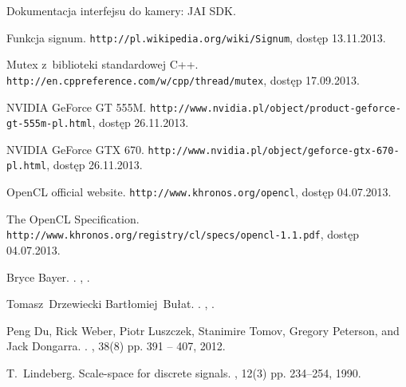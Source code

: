 \documentclass[pdflatex,11pt]{aghdpl}
\author{Tomasz Drzewiecki}
\date{2013}
\begin{document}
\titlepages

\tableofcontents
\clearpage










%
%
%
%


%

\begin{thebibliography}{10}

{Dokumentacja interfejsu do kamery: JAI SDK}.

Funkcja signum.
\newblock \texttt{http://pl.wikipedia.org/wiki/Signum}, dostęp 13.11.2013.

{Mutex z~biblioteki standardowej C++}.
\newblock \texttt{http://en.cppreference.com/w/cpp/thread/mutex}, dostęp 17.09.2013.

{NVIDIA GeForce GT 555M}.
\newblock \texttt{http://www.nvidia.pl/object/product-geforce-gt-555m-pl.html}, dostęp 26.11.2013.

{NVIDIA GeForce GTX 670}.
\newblock \texttt{http://www.nvidia.pl/object/geforce-gtx-670-pl.html}, dostęp 26.11.2013.

{OpenCL official website}.
\newblock \texttt{http://www.khronos.org/opencl}, dostęp 04.07.2013.

{The OpenCL Specification}.
\newblock \texttt{http://www.khronos.org/registry/cl/specs/opencl-1.1.pdf}, dostęp 04.07.2013.

Bryce Bayer.
.
,
.

Tomasz~Drzewiecki Bartłomiej~Bułat.
.
,
.

Peng Du, Rick Weber, Piotr Luszczek, Stanimire Tomov, Gregory Peterson, and
  Jack Dongarra.
.
, 38(8) pp. 391 -- 407, 2012.

T.~Lindeberg.
\newblock Scale-space for discrete signals.
, 12(3) pp. 234--254, 1990.


\end{thebibliography}
\end{document}
